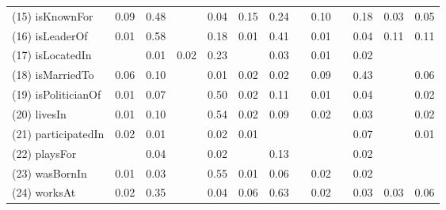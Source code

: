 \begin{table}[t]
\begin{center}
\begin{tabular}{|l||*{12}{c}|}
            (15) isKnownFor  & 0.09  & 0.48  &    & 0.04  & 0.15  & 0.24  &    & 0.10  &    & 0.18  & 0.03  & 0.05 \\
            (16) isLeaderOf  & 0.01  & 0.58  &    & 0.18  & 0.01  & 0.41  &    & 0.01  &    & 0.04  & 0.11  & 0.11 \\
            (17) isLocatedIn  &    & 0.01  & 0.02  & 0.23  &    & 0.03  &    & 0.01  &    & 0.02  &    &   \\
            (18) isMarriedTo  & 0.06  & 0.10  &    & 0.01  & 0.02  & 0.02  &    & 0.09  &    & 0.43  &    & 0.06 \\
            (19) isPoliticianOf  & 0.01  & 0.07  &    & 0.50  & 0.02  & 0.11  &    & 0.01  &    & 0.04  &    & 0.02 \\
            (20) livesIn  & 0.01  & 0.10  &    & 0.54  & 0.02  & 0.09  &    & 0.02  &    & 0.03  &    & 0.02 \\
            (21) participatedIn  & 0.02  & 0.01  &    & 0.02  & 0.01  &    &    &    &    & 0.07  &    & 0.01 \\
            (22) playsFor  &    & 0.04  &    & 0.02  &    & 0.13  &    &    &    & 0.02  &    &   \\
            (23) wasBornIn  & 0.01  & 0.03  &    & 0.55  & 0.01  & 0.06  &    & 0.02  &    & 0.02  &    &   \\
            (24) worksAt  & 0.02  & 0.35  &    & 0.04  & 0.06  & 0.63  &    & 0.02  &    & 0.03  & 0.03  & 0.06 \\
            \hline
            

\end{tabular}
\end{center}
\end{table}
